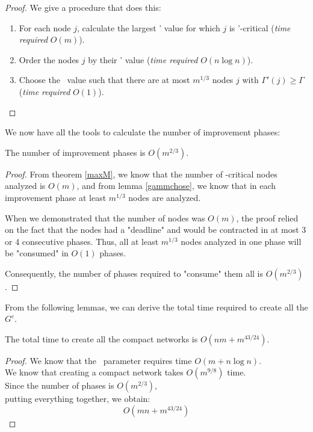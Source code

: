 \begin{proof}
    We give a procedure that does this: 
    \begin{enumerate}
        \item For each node \( j \), calculate the largest \gmm' value for which \( j \) is \gmm'-critical (\textit{time required} \( O(m) \)).
        \item Order the nodes \( j \) by their \gmm' value (\textit{time required} \( O(n\log n) \)).
        \item Choose the \gmm\ value such that there are at most \( m^{1/3} \) nodes \( j \) with \( \Gamma'(j) \ge \Gamma \) (\textit{time required} \( O(1) \)).
    \end{enumerate}
\end{proof}

We now have all the tools to calculate the number of improvement phases:

\begin{lemma}
    The number of improvement phases is \( O(m^{2/3}) \).
\end{lemma}

\begin{proof}
    From theorem \ref{maxM}, we know that the number of \gmm-critical nodes analyzed is \( O(m) \), and from lemma \ref{gammchose}, we know that in each improvement phase at least \( m^{1/3} \) nodes are analyzed.

    When we demonstrated that the number of nodes was \( O(m) \), the proof relied on the fact that the nodes had a "deadline" and would be contracted in at most 3 or 4 consecutive phases. Thus, all at least \( m^{1/3} \) nodes analyzed in one phase will be "consumed" in \( O(1) \) phases.

    Consequently, the number of phases required to "consume" them all is \( O(m^{2/3}) \).
\end{proof}

From the following lemmas, we can derive the total time required to create all the \( G^c \).

\begin{lemma}
    The total time to create all the compact networks is \( O(nm + m^{43/24}) \).
\end{lemma}
\begin{proof}
    We know that the \gmm\ parameter requires time \( O(m + n \log n) \).\\
    We know that creating a compact network takes \( O(m^{9/8}) \) time.\\
    Since the number of phases is \( O(m^{2/3}) \),\\
    putting everything together, we obtain:
    \[ O(mn + m^{43/24}) \]
\end{proof}

